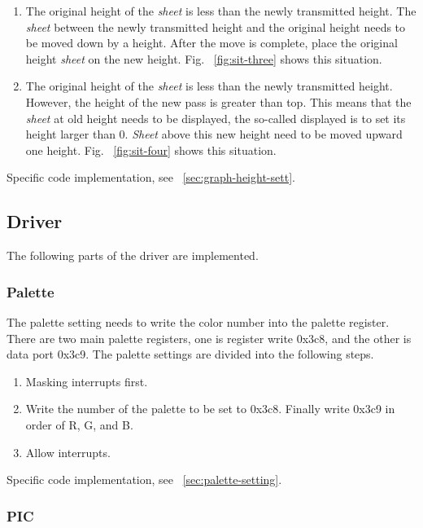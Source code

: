 \documentclass{swfcthesis}
\begin{document}
\begin{enumerate}
\item The original height of the \emph{sheet} is less than the newly transmitted
  height. The \emph{sheet} between the newly transmitted height and the original height
  needs to be moved down by a height. After the move is complete, place the original
  height \emph{sheet} on the new height. Fig. ~\ref{fig:sit-three} shows this situation.


\item The original height of the \emph{sheet} is less than the newly transmitted
  height. However, the height of the new pass is greater than top. This means that the
  \emph{sheet} at old height needs to be displayed, the so-called displayed is to set its height
  larger than 0. \emph{Sheet} above this new height need to be moved upward one
  height. Fig. ~\ref{fig:sit-four} shows this situation.
        
\end{enumerate}
Specific code implementation, see ~\ref{sec:graph-height-sett}.

\subsection{Driver}
\label{sec:driver-1}
The following parts of the driver are implemented.

\subsubsection{Palette}
\label{sec:palette}

The palette setting needs to write the color number into the palette register. There are
two main palette registers, one is register write 0x3c8, and the other is data port
0x3c9. The palette settings are divided into the following steps.

\begin{enumerate}
\item Masking interrupts first.
\item Write the number of the palette to be set to 0x3c8. Finally write 0x3c9 in order of
  R, G, and B.
\item Allow interrupts.
\end{enumerate}
Specific code implementation, see ~\ref{sec:palette-setting}.

\subsubsection{PIC}
\label{sec:pic}
\end{document}

